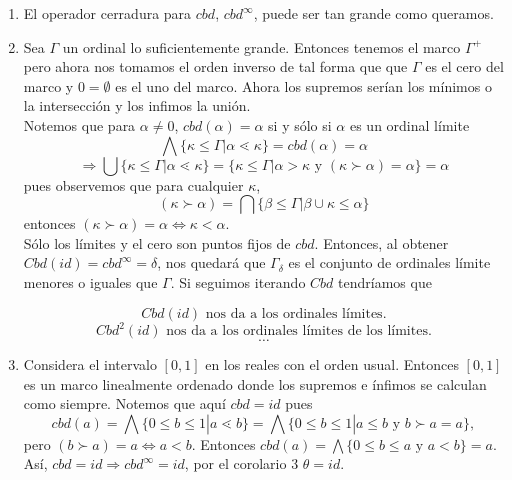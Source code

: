 \begin{exa}
\begin{enumerate}
\item El operador cerradura para $cbd$, $cbd^\infty$, puede ser tan grande como queramos.

\item Sea $\Gamma$ un ordinal lo suficientemente grande. Entonces tenemos el marco $\Gamma^+$ pero ahora nos tomamos el orden inverso de tal forma que que $\Gamma$ es el cero del marco y $0=\emptyset$ es el uno del marco. Ahora los supremos serían los mínimos o la intersección y los infimos la unión.\\
Notemos que para $\alpha\neq 0$, $cbd(\alpha)=\alpha$ si y sólo si $\alpha$ es un ordinal límite 
$$\bigwedge\{\kappa\leq\Gamma|\alpha\lessdot \kappa\}=cbd(\alpha)=\alpha$$
$$\Rightarrow \bigcup\{\kappa\leq \Gamma|\alpha\lessdot \kappa\}=\{\kappa\leq \Gamma|\alpha>\kappa\mbox{  y  }(\kappa\succ \alpha)=\alpha\}=\alpha$$
pues observemos que para cualquier $\kappa$,
$$(\kappa\succ \alpha)=\bigcap\{\beta\leq \Gamma|\beta\cup\kappa\leq \alpha\}$$
entonces $(\kappa\succ \alpha)=\alpha\Leftrightarrow \kappa<\alpha$.\\
Sólo los límites y el cero son puntos fijos de $cbd$.
Entonces, al obtener $Cbd(id)=cbd^\infty=\delta$, nos quedará que $\Gamma_\delta$ es el conjunto de ordinales límite menores o iguales que $\Gamma$. Si seguimos iterando $Cbd$ tendríamos que 

\[Cbd(id)\mbox{  nos da a los ordinales límites}.\]
\[Cbd^2(id)\mbox{  nos da a los ordinales límites de los límites}.\]
 \[\ldots\]
 
\item Considera el intervalo $[0,1]$ en los reales con el orden usual. Entonces $[0,1]$ es un marco linealmente ordenado donde los supremos e ínfimos se calculan como siempre. Notemos que aquí $cbd=id$ pues 
\[cbd(a)=\bigwedge\{0\leq b\leq 1|a\lessdot b\}=\bigwedge\{0\leq b\leq 1|a\leq b\mbox{  y  }b\succ a=a\}, \]
pero $(b\succ a)=a\Leftrightarrow a<b$. Entonces $cbd(a)=\bigwedge\{0\leq b\leq a\mbox{  y  }a<b\}=a$. Así, $cbd=id\Rightarrow cbd^\infty=id$, por el corolario 3 $\theta=id$. 

\end{enumerate}
\end{exa}







